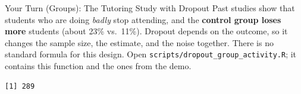 \documentclass[
  ignorenonframetext,
  aspectratio=169,
]{beamer}
\newenvironment{Shaded}{\begin{snugshade}}{\end{snugshade}}
\newcommand{\AttributeTok}[1]{\textcolor[rgb]{0.40,0.45,0.13}{#1}}
\newcommand{\CommentTok}[1]{\textcolor[rgb]{0.37,0.37,0.37}{#1}}
\newcommand{\ControlFlowTok}[1]{\textcolor[rgb]{0.00,0.23,0.31}{\textbf{#1}}}
\newcommand{\DecValTok}[1]{\textcolor[rgb]{0.68,0.00,0.00}{#1}}
\newcommand{\FloatTok}[1]{\textcolor[rgb]{0.68,0.00,0.00}{#1}}
\newcommand{\FunctionTok}[1]{\textcolor[rgb]{0.28,0.35,0.67}{#1}}
\newcommand{\NormalTok}[1]{\textcolor[rgb]{0.00,0.23,0.31}{#1}}
\newcommand{\OtherTok}[1]{\textcolor[rgb]{0.00,0.23,0.31}{#1}}
\newcommand{\SpecialCharTok}[1]{\textcolor[rgb]{0.37,0.37,0.37}{#1}}
\begin{document}
\begin{frame}[fragile]{Your Turn (Groups): The Tutoring Study with
Dropout}
\label{your-turn-groups-the-tutoring-study-with-dropout}
\small Past studies show that students who are doing \textit{badly} stop
attending, and the \textbf{control group loses more} students (about
23\% vs.~11\%). Dropout depends on the outcome, so it changes the sample
size, the estimate, and the noise together. There is no standard formula
for this design. Open \texttt{scripts/dropout\_group\_activity.R}; it
contains this function and the ones from the demo.

\begin{Shaded}
\end{Shaded}

\begin{verbatim}
[1] 289
\end{verbatim}
\end{frame}
\end{document}
